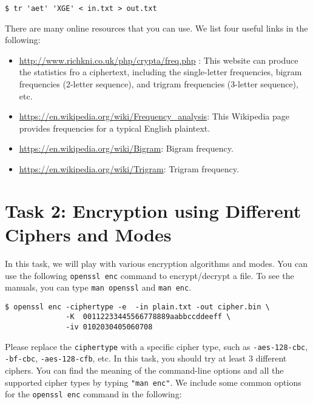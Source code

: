 \begin{lstlisting}
$ tr 'aet' 'XGE' < in.txt > out.txt
\end{lstlisting}
 

There are many online resources that you can use. We list four useful links in
the following: 


\begin{itemize}
\item \url{http://www.richkni.co.uk/php/crypta/freq.php} : This website can produce the
statistics fro a ciphertext, including the single-letter frequencies, bigram 
frequencies (2-letter sequence), and trigram frequencies (3-letter sequence), etc. 

\item \url{https://en.wikipedia.org/wiki/Frequency_analysis}: This Wikipedia page
provides frequencies for a typical English plaintext. 

\item \url{https://en.wikipedia.org/wiki/Bigram}: Bigram frequency.

\item  \url{https://en.wikipedia.org/wiki/Trigram}: Trigram frequency.
\end{itemize}
 
 


\section{Task 2: Encryption using Different Ciphers and Modes}

In this task, we will play with various encryption algorithms 
and modes. You can use the following {\tt openssl enc} 
command to encrypt/decrypt a file. To see the manuals, you can 
type {\tt man openssl} and {\tt man enc}.

\begin{lstlisting}
$ openssl enc -ciphertype -e  -in plain.txt -out cipher.bin \
              -K  00112233445566778889aabbccddeeff \
              -iv 0102030405060708 
\end{lstlisting}

Please replace the {\tt ciphertype} with a specific cipher type,
such as {\tt -aes-128-cbc}, {\tt -bf-cbc}, {\tt -aes-128-cfb},
etc. In this task, you should try at least 3 different ciphers. 
You can find the meaning of the 
command-line options and all the supported cipher types 
by typing {\tt "man enc"}.
We include some common options for the {\tt openssl enc} 
command in the following:

